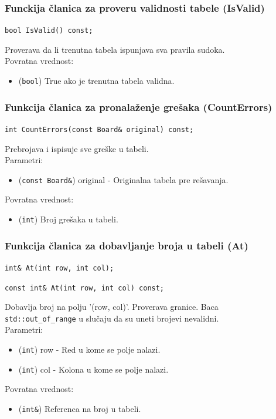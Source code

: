 \documentclass[a4paper]{article}
\begin{document}
    \subsubsection{Funckija članica za proveru validnosti tabele (IsValid)}
    \texttt{bool IsValid() const;}
    \par Proverava da li trenutna tabela ispunjava sva pravila sudoka.\\
    Povratna vrednost:
    \begin{itemize}
        \item (\texttt{bool}) True ako je trenutna tabela validna.
    \end{itemize}



    \subsubsection{Funkcija članica za pronalaženje grešaka (CountErrors)}
    \texttt{int CountErrors(const Board\& original) const;}
    \par Prebrojava i ispisuje sve greške u tabeli.\\
    Parametri:
    \begin{itemize}
        \item (\texttt{const Board\&}) original - Originalna tabela pre rešavanja.
    \end{itemize}
    Povratna vrednost:
    \begin{itemize}
        \item (\texttt{int}) Broj grešaka u tabeli.
    \end{itemize}

    \subsubsection{Funkcija članica za dobavljanje broja u tabeli (At)}
    \texttt{int\& At(int row, int col);}
    \par\texttt{const int\& At(int row, int col) const;}
    \par Dobavlja broj na polju '(row, col)'. Proverava granice. Baca \\ \texttt{std::out\_of\_range} u slučaju da
    su uneti brojevi nevalidni.\\
    Parametri:
    \begin{itemize}
        \item (\texttt{int}) row - Red u kome se polje nalazi.
        \item (\texttt{int}) col - Kolona u kome se polje nalazi.
    \end{itemize}
    Povratna vrednost:
    \begin{itemize}
        \item (\texttt{int\&}) Referenca na broj u tabeli.
    \end{itemize}
    
\end{document}
